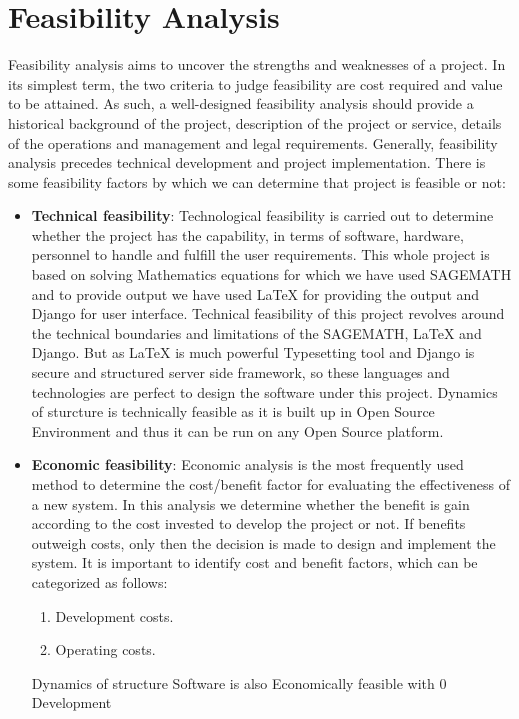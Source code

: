 \section{Feasibility Analysis}
Feasibility analysis aims to uncover the strengths and weaknesses of 
a project. In its simplest term, the two criteria to judge feasibility 
are cost required and value to be attained. As such, a well-designed 
feasibility analysis should provide a historical background of the 
project, description of the project or service, details of the 
operations and management and legal requirements. Generally, feasibility 
analysis precedes technical development and project implementation. 
There is some feasibility factors by which we can determine that 
project is feasible or not:
\begin{itemize}
\item {\bf{Technical feasibility}}: Technological feasibility is carried 
out to determine whether the project has the capability, in terms of 
software, hardware, personnel to handle and fulfill the user 
requirements. This whole project is based on solving Mathematics equations for which we have used SAGEMATH and to provide output we have used \LaTeX{} for providing the output and Django for user interface. Technical feasibility of this project revolves around the technical boundaries and limitations of the SAGEMATH, \LaTeX{} and Django. But as \LaTeX{} is much powerful Typesetting tool and Django is secure and structured server side framework, so these languages and technologies are perfect to design the software under this project. Dynamics of sturcture is technically feasible as it is built up in Open 
Source Environment and thus it can be run on any Open Source platform.
\item {\bf{Economic feasibility}}: Economic analysis is the most 
frequently used method to determine the cost/benefit factor for 
evaluating the effectiveness of a new system. In this analysis we 
determine whether the benefit is gain according to the cost invested 
to develop the project or not. If benefits outweigh costs, only then 
the decision is made to design and implement the system. It is 
important to identify cost and benefit factors, which can be categorized 
as follows:
\begin{enumerate}
\item Development costs.
\item Operating costs.
\end{enumerate}
Dynamics of structure Software is also Economically feasible with 0 Development 

\end{itemize}
